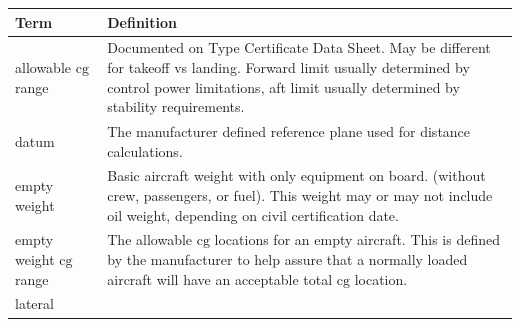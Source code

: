 \documentclass[
]{book}
\begin{document}
\begin{longtable}[]{@{}ll@{}}
\toprule
\begin{minipage}[b]{0.11\columnwidth}\raggedright
Term\strut
\end{minipage} & \begin{minipage}[b]{0.83\columnwidth}\raggedright
Definition\strut
\end{minipage}\tabularnewline
\midrule
\endhead
\begin{minipage}[t]{0.11\columnwidth}\raggedright
allowable \(\mathrm{cg}\) range\strut
\end{minipage} & \begin{minipage}[t]{0.83\columnwidth}\raggedright
Documented on Type Certificate Data Sheet. May be different for takeoff vs landing. Forward limit usually determined by control power limitations, aft limit usually determined by stability requirements.\strut
\end{minipage}\tabularnewline
\begin{minipage}[t]{0.11\columnwidth}\raggedright
datum\strut
\end{minipage} & \begin{minipage}[t]{0.83\columnwidth}\raggedright
The manufacturer defined reference plane used for distance calculations.\strut
\end{minipage}\tabularnewline
\begin{minipage}[t]{0.11\columnwidth}\raggedright
empty weight\strut
\end{minipage} & \begin{minipage}[t]{0.83\columnwidth}\raggedright
Basic aircraft weight with only equipment on board. (without crew, passengers, or fuel). This weight may or may not include oil weight, depending on civil certification date.\strut
\end{minipage}\tabularnewline
\begin{minipage}[t]{0.11\columnwidth}\raggedright
empty weight \(\mathrm{cg}\) range\strut
\end{minipage} & \begin{minipage}[t]{0.83\columnwidth}\raggedright
The allowable \(\mathrm{cg}\) locations for an empty aircraft. This is defined by the manufacturer to help assure that a normally loaded aircraft will have an acceptable total \(\mathrm{cg}\) location.\strut
\end{minipage}\tabularnewline
\begin{minipage}[t]{0.11\columnwidth}\raggedright
lateral\strut
\end{minipage} & \begin{minipage}[t]{0.83\columnwidth}\raggedright

\end{minipage}
\end{longtable}
\end{document}
